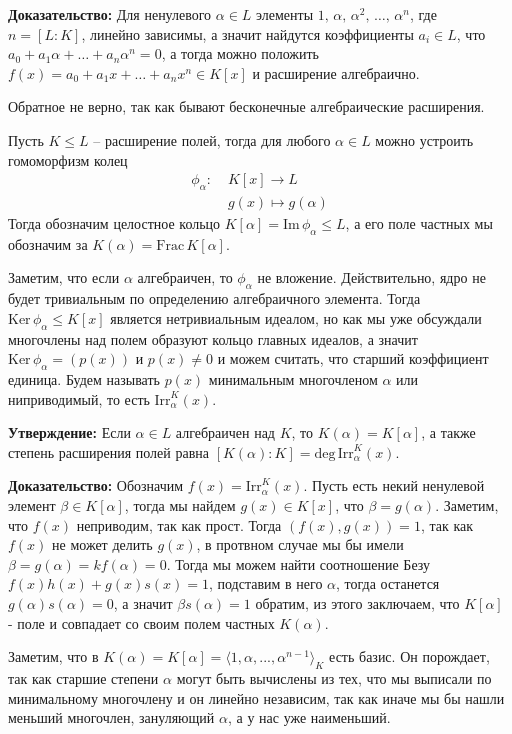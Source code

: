 \documentclass[a4paper, 12pt]{book}
\begin{document}
\textbf{Доказательство:} Для ненулевого $\alpha\in L$ элементы $1,\,\alpha,\,
\alpha^2,\,\ldots,\,\alpha^n$, где $n=[L:K]$, линейно зависимы, а значит
найдутся коэффициенты $a_i\in L$, что $a_0+a_1\alpha+\ldots+a_n\alpha^n=0$, 
а тогда можно положить $f(x)=a_0+a_1x+\ldots+a_nx^n\in K[x]$ и расширение
алгебраично.

Обратное не верно, так как бывают бесконечные алгебраические расширения.

Пусть $K\le L$ – расширение полей, тогда для любого $\alpha\in L$ можно
устроить гомоморфизм колец 
\begin{align*}
    \phi_\alpha:&\;K[x]\longrightarrow L\\
    &\;g(x)\mapsto g(\alpha)
\end{align*}
Тогда обозначим целостное кольцо $K[\alpha]=\text{Im}\,\phi_\alpha\le L$, а его
поле частных мы обозначим за $K(\alpha)=\text{Frac}\,K[\alpha]$.

Заметим, что если $\alpha$ алгебраичен, то $\phi_\alpha$ не вложение.
Действительно, ядро не будет тривиальным по определению алгебраичного элемента.
Тогда $\text{Ker}\,\phi_\alpha\le K[x]$ является нетривиальным идеалом, но как
мы уже обсуждали многочлены над полем образуют кольцо главных идеалов, а значит
$\text{Ker}\,\phi_\alpha=(p(x))$ и $p(x)\neq 0$ и можем считать, что старший
коэффициент единица. Будем называть $p(x)$ минимальным многочленом $\alpha$ или
ниприводимый, то есть $\text{Irr}_\alpha^K(x)$.

\textbf{Утверждение:} Если $\alpha\in L$ алгебраичен над $K$, то $K(\alpha)=
K[\alpha]$, а также степень расширения полей равна $[K(\alpha):K]=\text{deg}\,
\text{Irr}_\alpha^K(x)$.

\textbf{Доказательство:} Обозначим $f(x)=\text{Irr}_\alpha^K(x)$. Пусть есть
некий ненулевой элемент $\beta\in K[\alpha]$, тогда мы найдем $g(x)\in K[x]$,
что $\beta=g(\alpha)$. Заметим, что $f(x)$ неприводим, так как прост. Тогда
$(f(x),g(x))=1$, так как $f(x)$ не может делить $g(x)$, в протвном случае мы бы
имели $\beta=g(\alpha)=kf(\alpha)=0$. Тогда мы можем найти соотношение Безу
$f(x)h(x)+g(x)s(x)=1$, подставим в него $\alpha$, тогда останется $g(\alpha)
s(\alpha)=0$, а значит $\beta s(\alpha)=1$ обратим, из этого заключаем, что
$K[\alpha]$ - поле и совпадает со своим полем частных $K(\alpha)$.

Заметим, что в $K(\alpha)=K[\alpha]=\langle1,\alpha,...,\alpha^{n-1}\rangle_K$
есть базис. Он порождает, так как старшие степени $\alpha$ могут быть вычислены
из тех, что мы выписали по минимальному многочлену и он линейно независим, так
как иначе мы бы нашли меньший многочлен, зануляющий $\alpha$, а у нас уже
наименьший.
\end{document}
